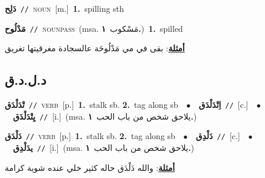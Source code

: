 \documentclass[10pt,a4paper,twoside]{article} %
\begin{document}
\begin{multicols}{2}
{\setlength\topsep{0pt}\textbf{\foreignlanguage{arabic}{دَلِح}}\ {\color{gray}\texttt{//}\color{black}}\ \textsc{noun}\ [m.]\ \textbf{1.}~spilling sth\ } \vspace{2mm}

{\setlength\topsep{0pt}\textbf{\foreignlanguage{arabic}{مَدْلُوح}}\ {\color{gray}\texttt{//}\color{black}}\ \textsc{noun\textunderscore pass}\ \color{gray}(msa. \foreignlanguage{arabic}{مَسْكوب}~\foreignlanguage{arabic}{\textbf{١.}})\color{black}\ \textbf{1.}~spilled\  \begin{flushright}\color{gray}\foreignlanguage{arabic}{\textbf{\underline{\foreignlanguage{arabic}{أمثلة}}}: بقى في مي مَدْلُوحَة عالسجادة مغرقيتها تغريق}\end{flushright}\color{black}} \vspace{2mm}

\vspace{-3mm}
\subsection*{\color{blue}\foreignlanguage{arabic}{د.ل.د.ق}\color{blue}{}} 

{\setlength\topsep{0pt}\textbf{\foreignlanguage{arabic}{تْدَلْدَق}}\ {\color{gray}\texttt{//}\color{black}}\ \textsc{verb}\ [p.]\ \textbf{1.}~stalk sb.  \textbf{2.}~tag along sb\ \ $\bullet$\ \ \setlength\topsep{0pt}\textbf{\foreignlanguage{arabic}{اِتْدَلْدَق}}\ {\color{gray}\texttt{//}\color{black}}\ [c.]\ \ $\bullet$\ \ \setlength\topsep{0pt}\textbf{\foreignlanguage{arabic}{يِتْدَلْدَق}}\ {\color{gray}\texttt{//}\color{black}}\ [i.]\ \color{gray}(msa. \foreignlanguage{arabic}{يلاحق شخص من باب الحب}~\foreignlanguage{arabic}{\textbf{١.}})\color{black}\ } \vspace{2mm}

{\setlength\topsep{0pt}\textbf{\foreignlanguage{arabic}{دَلْدَق}}\ {\color{gray}\texttt{//}\color{black}}\ \textsc{verb}\ [p.]\ \textbf{1.}~stalk sb.  \textbf{2.}~tag along sb\ \ $\bullet$\ \ \setlength\topsep{0pt}\textbf{\foreignlanguage{arabic}{دَلْدِق}}\ {\color{gray}\texttt{//}\color{black}}\ [c.]\ \ $\bullet$\ \ \setlength\topsep{0pt}\textbf{\foreignlanguage{arabic}{يدَلْدِق}}\ {\color{gray}\texttt{//}\color{black}}\ [i.]\ \color{gray}(msa. \foreignlanguage{arabic}{يلاحق شخص من باب الحب}~\foreignlanguage{arabic}{\textbf{١.}})\color{black}\  \begin{flushright}\color{gray}\foreignlanguage{arabic}{\textbf{\underline{\foreignlanguage{arabic}{أمثلة}}}: والله دَلْدَق حاله كثير خلي عنده شوية كرامة}\end{flushright}\color{black}} \vspace{2mm}


\end{multicols}
\end{document}
